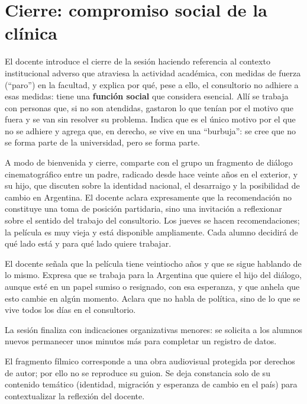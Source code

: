 \documentclass[12pt,oneside]{book}
\begin{document}
\chapter[Compromiso social de la cl\'inica]{Cierre: compromiso social de la cl\'inica}

El docente introduce el cierre de la sesi\'on haciendo referencia al contexto institucional adverso que atraviesa la actividad acad\'emica, con medidas de fuerza (``paro'') en la facultad, y explica por qu\'e, pese a ello, el consultorio no adhiere a esas medidas: tiene una \textbf{funci\'on social} que considera esencial. All\'i se trabaja con personas que, si no son atendidas, gastaron lo que ten\'ian por el motivo que fuera y se van sin resolver su problema. Indica que es el \'unico motivo por el que no se adhiere y agrega que, en derecho, se vive en una ``burbuja'': se cree que no se forma parte de la universidad, pero se forma parte.

A modo de bienvenida y cierre, comparte con el grupo un fragmento de di\'alogo cinematogr\'afico entre un padre, radicado desde hace veinte a\~nos en el exterior, y su hijo, que discuten sobre la identidad nacional, el desarraigo y la posibilidad de cambio en Argentina. El docente aclara expresamente que la recomendaci\'on no constituye una toma de posici\'on partidaria, sino una invitaci\'on a reflexionar sobre el sentido del trabajo del consultorio. Los jueves se hacen recomendaciones; la pel\'icula es muy vieja y est\'a disponible ampliamente. Cada alumno decidir\'a de qu\'e lado est\'a y para qu\'e lado quiere trabajar.

El docente se\~nala que la pel\'icula tiene veintiocho a\~nos y que se sigue hablando de lo mismo. Expresa que se trabaja para la Argentina que quiere el hijo del di\'alogo, aunque est\'e en un papel sumiso o resignado, con esa esperanza, y que anhela que esto cambie en alg\'un momento. Aclara que no habla de pol\'itica, sino de lo que se vive todos los d\'ias en el consultorio.

La sesi\'on finaliza con indicaciones organizativas menores: se solicita a los alumnos nuevos permanecer unos minutos m\'as para completar un registro de datos.

\begin{note}
El fragmento fílmico corresponde a una obra audiovisual protegida por derechos de autor; por ello no se reproduce su guion. Se deja constancia solo de su contenido tem\'atico (identidad, migraci\'on y esperanza de cambio en el pa\'is) para contextualizar la reflexi\'on del docente.
\end{note}
\end{document}
